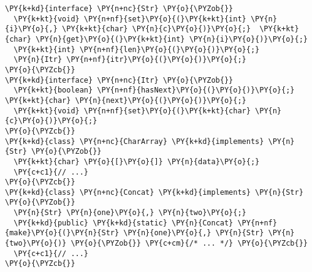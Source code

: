 \begin{Verbatim}[commandchars=\\\{\}]
\PY{k+kd}{interface} \PY{n+nc}{Str} \PY{o}{\PYZob{}}
  \PY{k+kt}{void} \PY{n+nf}{set}\PY{o}{(}\PY{k+kt}{int} \PY{n}{i}\PY{o}{,} \PY{k+kt}{char} \PY{n}{c}\PY{o}{)}\PY{o}{;}  \PY{k+kt}{char} \PY{n}{get}\PY{o}{(}\PY{k+kt}{int} \PY{n}{i}\PY{o}{)}\PY{o}{;}
  \PY{k+kt}{int} \PY{n+nf}{len}\PY{o}{(}\PY{o}{)}\PY{o}{;}
  \PY{n}{Itr} \PY{n+nf}{itr}\PY{o}{(}\PY{o}{)}\PY{o}{;}
\PY{o}{\PYZcb{}}
\PY{k+kd}{interface} \PY{n+nc}{Itr} \PY{o}{\PYZob{}}
  \PY{k+kt}{boolean} \PY{n+nf}{hasNext}\PY{o}{(}\PY{o}{)}\PY{o}{;}        \PY{k+kt}{char} \PY{n}{next}\PY{o}{(}\PY{o}{)}\PY{o}{;}
  \PY{k+kt}{void} \PY{n+nf}{set}\PY{o}{(}\PY{k+kt}{char} \PY{n}{c}\PY{o}{)}\PY{o}{;} 
\PY{o}{\PYZcb{}}
\PY{k+kd}{class} \PY{n+nc}{CharArray} \PY{k+kd}{implements} \PY{n}{Str} \PY{o}{\PYZob{}}
  \PY{k+kt}{char} \PY{o}{[}\PY{o}{]} \PY{n}{data}\PY{o}{;}
  \PY{c+c1}{// ...}
\PY{o}{\PYZcb{}}
\PY{k+kd}{class} \PY{n+nc}{Concat} \PY{k+kd}{implements} \PY{n}{Str} \PY{o}{\PYZob{}}
  \PY{n}{Str} \PY{n}{one}\PY{o}{,} \PY{n}{two}\PY{o}{;}
  \PY{k+kd}{public} \PY{k+kd}{static} \PY{n}{Concat} \PY{n+nf}{make}\PY{o}{(}\PY{n}{Str} \PY{n}{one}\PY{o}{,} \PY{n}{Str} \PY{n}{two}\PY{o}{)} \PY{o}{\PYZob{}} \PY{c+cm}{/* ... */} \PY{o}{\PYZcb{}}
  \PY{c+c1}{// ...}
\PY{o}{\PYZcb{}}
\end{Verbatim}
